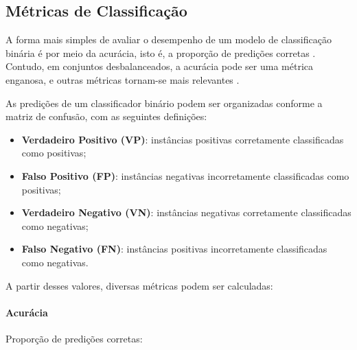 \documentclass[12pt]{article}
\begin{document}












\subsection{Métricas de Classificação}
\label{sec:metrics_classification}

A forma mais simples de avaliar o desempenho de um modelo de classificação binária é por meio da acurácia, isto é, a proporção de predições corretas \cite{bishop2006pattern}. Contudo, em conjuntos desbalanceados, a acurácia pode ser uma métrica enganosa, e outras métricas tornam-se mais relevantes \cite{goodfellow2016}.

As predições de um classificador binário podem ser organizadas conforme a matriz de confusão, com as seguintes definições:

\begin{itemize}[noitemsep]
    \item \textbf{Verdadeiro Positivo (VP)}: instâncias positivas corretamente classificadas como positivas;
    \item \textbf{Falso Positivo (FP)}: instâncias negativas incorretamente classificadas como positivas;
    \item \textbf{Verdadeiro Negativo (VN)}: instâncias negativas corretamente classificadas como negativas;
    \item \textbf{Falso Negativo (FN)}: instâncias positivas incorretamente classificadas como negativas.
\end{itemize}

A partir desses valores, diversas métricas podem ser calculadas:

\paragraph{Acurácia} Proporção de predições corretas:
\end{document}
